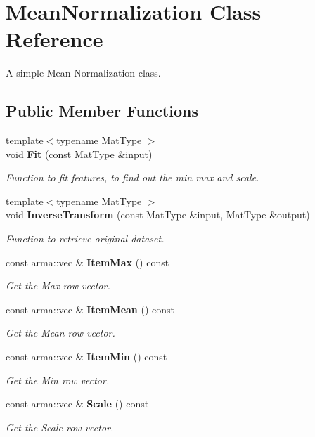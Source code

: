 \section{Mean\+Normalization Class Reference}
\label{classmlpack_1_1data_1_1MeanNormalization}


A simple Mean Normalization class.  


\subsection*{Public Member Functions}
\begin{DoxyCompactItemize}
\item 
{\footnotesize template$<$typename Mat\+Type $>$ }\\void \textbf{ Fit} (const Mat\+Type \&input)
\begin{DoxyCompactList}\small\item\em Function to fit features, to find out the min max and scale. \end{DoxyCompactList}\item 
{\footnotesize template$<$typename Mat\+Type $>$ }\\void \textbf{ Inverse\+Transform} (const Mat\+Type \&input, Mat\+Type \&output)
\begin{DoxyCompactList}\small\item\em Function to retrieve original dataset. \end{DoxyCompactList}\item 
const arma\+::vec \& \textbf{ Item\+Max} () const
\begin{DoxyCompactList}\small\item\em Get the Max row vector. \end{DoxyCompactList}\item 
const arma\+::vec \& \textbf{ Item\+Mean} () const
\begin{DoxyCompactList}\small\item\em Get the Mean row vector. \end{DoxyCompactList}\item 
const arma\+::vec \& \textbf{ Item\+Min} () const
\begin{DoxyCompactList}\small\item\em Get the Min row vector. \end{DoxyCompactList}\item 
const arma\+::vec \& \textbf{ Scale} () const
\begin{DoxyCompactList}\small\item\em Get the Scale row vector. \end{DoxyCompactList}\item 

\end{DoxyCompactItemize}
